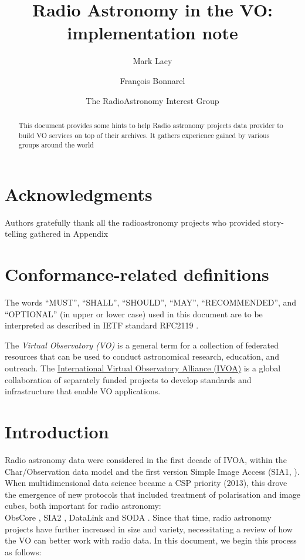 \documentclass[11pt,a4paper]{ivoa}
\title{Radio Astronomy in the VO:\\ implementation note}
\author[https://wiki.ivoa.net/twiki/bin/view/IVOA/MarkLacy]{Mark Lacy}
\author[https://wiki.ivoa.net/twiki/bin/view/IVOA/FrancoisBonnarel]{Fran\c cois Bonnarel}
\author{The RadioAstronomy Interest Group}
\begin{document}
\begin{abstract}
	This document provides some hints to help Radio astronomy projects data provider to build VO services on top of their archives. It gathers experience gained by various groups around the world
\end{abstract}


\section*{Acknowledgments}

Authors gratefully thank all the radioastronomy projects who provided story-telling gathered in Appendix

\section*{Conformance-related definitions}

The words ``MUST'', ``SHALL'', ``SHOULD'', ``MAY'', ``RECOMMENDED'', and
``OPTIONAL'' (in upper or lower case) used in this document are to be
interpreted as described in IETF standard RFC2119 \citep{std:RFC2119}.

The \emph{Virtual Observatory (VO)} is a
general term for a collection of federated resources that can be used
to conduct astronomical research, education, and outreach.
The \href{https://www.ivoa.net}{International
Virtual Observatory Alliance (IVOA)} is a global
collaboration of separately funded projects to develop standards and
infrastructure that enable VO applications.


\section{Introduction}

Radio astronomy data were considered in the first decade of IVOA, within the Char/Observation data model and the first version Simple Image Access (SIA1, \cite{std:SIAP}). When multidimensional data science became a CSP priority (2013), this drove the emergence of new protocols that included treatment of polarisation and image cubes, both important for radio astronomy:\\ ObsCore \citep{std:OBSCORE}, SIA2 \citep{std:SIAV2} , DataLink \citep{2015ivoa.spec.0617D} and SODA \citep{std:SODA}. 
Since that time, radio astronomy projects have further increased in size and variety, necessitating a review of how the VO can better work with radio data. In this document, we begin this process as follows:
\end{document}
